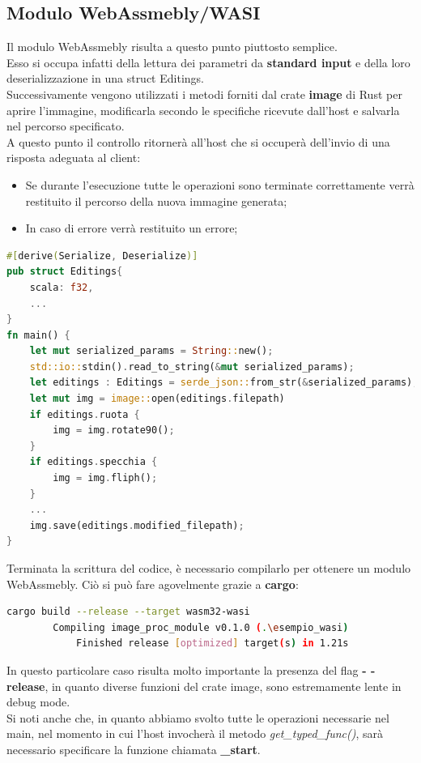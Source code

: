 \subsection{Modulo WebAssmebly/WASI}
Il modulo WebAssmebly risulta a questo punto piuttosto semplice.
\\Esso si occupa infatti della lettura dei parametri da \textbf{standard input} e della loro deserializzazione in una struct Editings.
\\Successivamente vengono utilizzati i metodi forniti dal crate \textbf{image} di Rust per aprire l'immagine, modificarla secondo le specifiche ricevute dall'host e salvarla nel percorso specificato.\cite{rust:image}
\\A questo punto il controllo ritornerà all'host che si occuperà dell'invio di una risposta adeguata al client:
\begin{itemize}
    \item Se durante l'esecuzione tutte le operazioni sono terminate correttamente verrà restituito il percorso della nuova immagine generata;
    \item In caso di errore verrà restituito un errore;
\end{itemize}
\begin{lstlisting}[language=rust, showstringspaces=false]
#[derive(Serialize, Deserialize)]
pub struct Editings{
    scala: f32,
    ...
}
fn main() {
    let mut serialized_params = String::new();
    std::io::stdin().read_to_string(&mut serialized_params);
    let editings : Editings = serde_json::from_str(&serialized_params);
    let mut img = image::open(editings.filepath)
    if editings.ruota {
        img = img.rotate90();
    }
    if editings.specchia {
        img = img.fliph();
    }
    ...
    img.save(editings.modified_filepath);
}
\end{lstlisting}
Terminata la scrittura del codice, è necessario compilarlo per ottenere un modulo WebAssmebly. Ciò si può fare agovelmente grazie a \textbf{cargo}:
\begin{lstlisting}[language=Bash, numbers=none]
cargo build --release --target wasm32-wasi
        Compiling image_proc_module v0.1.0 (.\esempio_wasi)
            Finished release [optimized] target(s) in 1.21s
\end{lstlisting}
In questo particolare caso risulta molto importante la presenza del flag \textbf{- - release}, in quanto diverse funzioni del crate image, sono estremamente lente in debug mode.
\\Si noti anche che, in quanto abbiamo svolto tutte le operazioni necessarie nel main, nel momento in cui l'host invocherà il metodo \emph{get\_typed\_func()}, sarà necessario specificare la funzione chiamata \textbf{\_start}.



